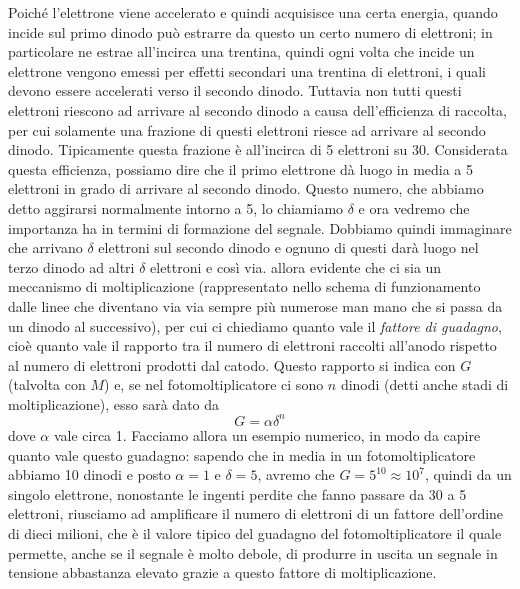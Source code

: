 Poiché l'elettrone viene accelerato e quindi acquisisce una certa energia, quando incide sul primo dinodo può estrarre da questo un certo numero di elettroni; in particolare ne estrae all'incirca una trentina, quindi ogni volta che incide un elettrone vengono emessi per effetti secondari una trentina di elettroni, i quali devono essere accelerati verso il secondo dinodo. Tuttavia non tutti questi elettroni riescono ad arrivare al secondo dinodo a causa dell'efficienza di raccolta, per cui solamente una frazione di questi elettroni riesce ad arrivare al secondo dinodo. Tipicamente questa frazione è all'incirca di 5 elettroni su 30. Considerata questa efficienza, possiamo dire che il primo elettrone dà luogo in media a 5 elettroni in grado di arrivare al secondo dinodo. Questo numero, che abbiamo detto aggirarsi normalmente intorno a 5, lo chiamiamo $\delta$ e ora vedremo che importanza ha in termini di formazione del segnale. Dobbiamo quindi immaginare che arrivano $\delta$ elettroni sul secondo dinodo e ognuno di questi darà luogo nel terzo dinodo ad altri $\delta$ elettroni e così via. \E allora evidente che ci sia un meccanismo di moltiplicazione (rappresentato nello schema di funzionamento dalle linee che diventano via via sempre più numerose man mano che si passa da un dinodo al successivo), per cui ci chiediamo quanto vale il \textit{fattore di guadagno}, cioè quanto vale il rapporto tra il numero di elettroni raccolti all'anodo rispetto al numero di elettroni prodotti dal catodo. Questo rapporto si indica con $G$ (talvolta con $M$) e, se nel fotomoltiplicatore ci sono $n$ dinodi (detti anche stadi di moltiplicazione), esso sarà dato da
\begin{equation*}
   G=\alpha \delta^n
\end{equation*}
dove $\alpha$ vale circa 1. Facciamo allora un esempio numerico, in modo da capire quanto vale questo guadagno: sapendo che in media in un fotomoltiplicatore abbiamo 10 dinodi e posto $\alpha=1$ e $\delta=5$, avremo che $G=5^{10}\approx 10^7$, quindi da un singolo elettrone, nonostante le ingenti perdite che fanno passare da 30 a 5 elettroni, riusciamo ad amplificare il numero di elettroni di un fattore dell'ordine di dieci milioni, che è il valore tipico del guadagno del fotomoltiplicatore il quale permette, anche se il segnale è molto debole, di produrre in uscita un segnale in tensione abbastanza elevato grazie a questo fattore di moltiplicazione.

